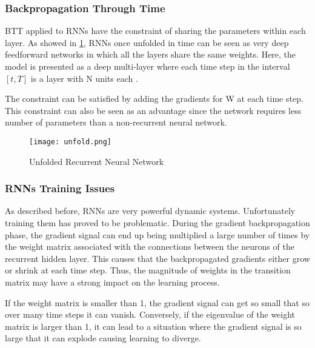 \subsubsection{Backpropagation Through Time}
BTT applied to RNNs have the constraint of sharing the parameters within each layer. As showed in  \ref{fig:unfold}, RNNs once unfolded in time can be seen as very deep feedforward networks in which all the layers share the same weights\cite{lecun2015deep}. Here, the model is presented as a deep multi-layer where each time step in the interval $[t,T]$ is a layer with N units each \cite{pascanu2013difficulty}. 

The constraint can be satisfied by adding the gradients for W at each time step. This constraint can also be seen as an advantage since the network requires less number of parameters than a non-recurrent neural network.

\begin{figure}
\label{fig:unfold}
\center
\texttt{[image: unfold.png]}
\caption{Unfolded Recurrent Neural Network}
\end{figure}



\subsubsection{RNNs Training Issues}
As described before, RNNs are very powerful dynamic systems. Unfortunately training them has proved to be problematic. During the gradient backpropagation phase, the gradient signal can end up being multiplied a large number of times by the weight matrix associated with the connections between the neurons of the recurrent hidden layer. This causes that the backpropagated gradients either grow or shrink at each time step. Thus, the magnitude of weights in the transition matrix may have a strong impact on the learning process.

If the  weight matrix is smaller than 1, the gradient signal can get so small that so over many time steps it can vanish. Conversely, if the eigenvalue of the weight matrix is larger than 1, it can lead to a situation where the gradient signal is so large that it can explode causing learning to diverge. 

